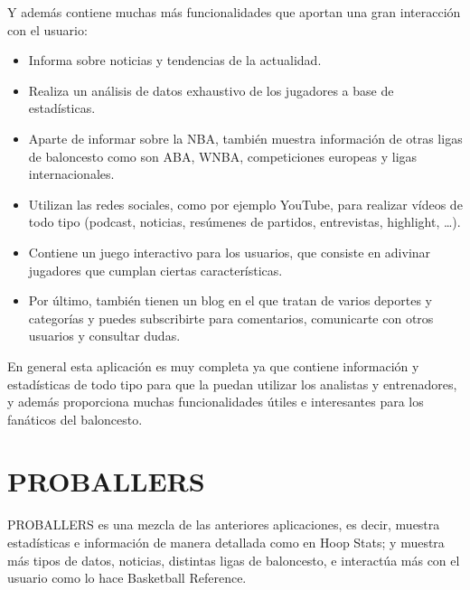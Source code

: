 Y además contiene muchas más funcionalidades que aportan una gran interacción con el usuario:
\begin{itemize}
\tightlist
    \item Informa sobre noticias y tendencias de la actualidad.
    \item Realiza un análisis de datos exhaustivo de los jugadores a base de estadísticas. 
    \item Aparte de informar sobre la NBA, también muestra información de otras ligas de baloncesto como son ABA, WNBA, competiciones europeas y ligas internacionales. 
    \item Utilizan las redes sociales, como por ejemplo YouTube, para realizar vídeos de todo tipo (podcast, noticias, resúmenes de partidos, entrevistas, highlight, \ldots). 
    \item Contiene un juego interactivo para los usuarios, que consiste en adivinar jugadores que cumplan ciertas características. 
    \item Por último, también tienen un blog en el que tratan de varios deportes y categorías y puedes subscribirte para comentarios, comunicarte con otros usuarios y consultar dudas.
\end{itemize}

En general esta aplicación es muy completa ya que contiene información y estadísticas de todo tipo para que la puedan utilizar los analistas y entrenadores, y además proporciona muchas funcionalidades útiles e interesantes para los fanáticos del baloncesto. 


\hfill

\section{PROBALLERS}
PROBALLERS \cite{proballers} es una mezcla de las anteriores aplicaciones, es decir, muestra estadísticas e información de manera detallada como en Hoop Stats; y muestra más tipos de datos, noticias, distintas ligas de baloncesto, e interactúa más con el usuario como lo hace Basketball Reference. 

